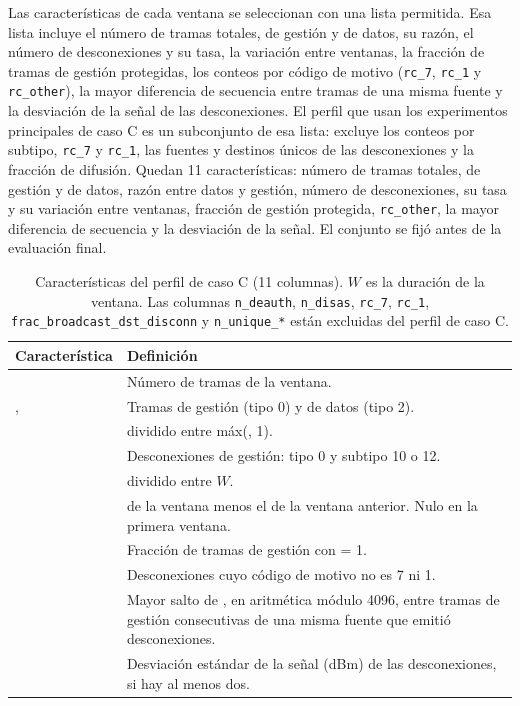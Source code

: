 \documentclass[journal]{IEEEtran}
\begin{document}
Las características de cada ventana se seleccionan con una lista permitida. Esa lista incluye el número de tramas totales, de gestión y de datos, su razón, el número de desconexiones y su tasa, la variación entre ventanas, la fracción de tramas de gestión protegidas, los conteos por código de motivo (\texttt{rc\_7}, \texttt{rc\_1} y \texttt{rc\_other}), la mayor diferencia de secuencia entre tramas de una misma fuente y la desviación de la señal de las desconexiones. El perfil que usan los experimentos principales de caso C es un subconjunto de esa lista: excluye los conteos por subtipo, \texttt{rc\_7} y \texttt{rc\_1}, las fuentes y destinos únicos de las desconexiones y la fracción de difusión. Quedan 11 características: número de tramas totales, de gestión y de datos, razón entre datos y gestión, número de desconexiones, su tasa y su variación entre ventanas, fracción de gestión protegida, \texttt{rc\_other}, la mayor diferencia de secuencia y la desviación de la señal. El conjunto se fijó antes de la evaluación final.

\begin{table}[htbp]
\caption{Características del perfil de caso C (11 columnas). $W$ es la duración de la ventana. Las columnas \texttt{n\_deauth}, \texttt{n\_disas}, \texttt{rc\_7}, \texttt{rc\_1}, \texttt{frac\_broadcast\_dst\_disconn} y \texttt{n\_unique\_*} están excluidas del perfil de caso C.}
\label{tab:caracteristicas}
\centering
\footnotesize
\begin{tabularx}{\textwidth}{p{4.5cm}Y}
\hline
Característica & Definición \\
\hline
{} & Número de tramas de la ventana. \\
,  & Tramas de gestión (tipo 0) y de datos (tipo 2). \\
 &  dividido entre máx(, 1). \\
 & Desconexiones de gestión: tipo 0 y subtipo 10 o 12. \\
 &  dividido entre $W$. \\
 &  de la ventana menos el de la ventana anterior. Nulo en la primera ventana. \\
 & Fracción de tramas de gestión con  = 1. \\
 & Desconexiones cuyo código de motivo no es 7 ni 1. \\
 & Mayor salto de , en aritmética módulo 4096, entre tramas de gestión consecutivas de una misma fuente que emitió desconexiones. \\
 & Desviación estándar de la señal (dBm) de las desconexiones, si hay al menos dos. \\
\hline
\end{tabularx}
\end{table}
\end{document}
